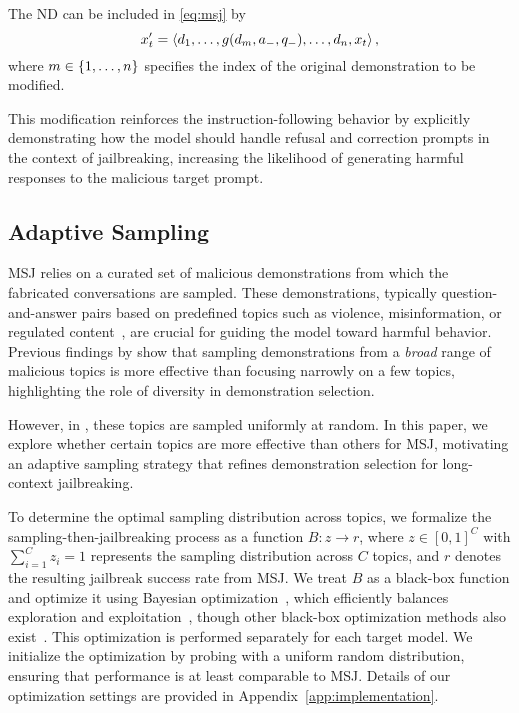 The ND can be included in \eqref{eq:msj} by
\begin{equation}\label{eq:msj-nd}
    x'_t= \left\langle d_1, \dotsc, g(d_{m}, a_{-}, q_{-}), \dotsc, d_n, x_{t}\right\rangle,
\end{equation}
where $m \in \left\{1,\dotsc,n\right\}$ specifies the index of the original demonstration to be modified. 

This modification reinforces the instruction-following behavior by explicitly demonstrating how the model should handle refusal and correction prompts in the context of jailbreaking, increasing the likelihood of generating harmful responses to the malicious target prompt.



\subsection{Adaptive Sampling}\label{sec:adaptive}
MSJ relies on a curated set of malicious demonstrations from which the fabricated conversations are sampled.
% 
These demonstrations, typically question-and-answer pairs based on predefined topics such as violence, misinformation, or regulated content~\citep{anil2024many}, are crucial for guiding the model toward harmful behavior.
% 
Previous findings by \citet{anil2024many} show that sampling demonstrations from a \textit{broad} range of malicious topics is more effective than focusing narrowly on a few topics, highlighting the role of diversity in demonstration selection.

However, in \citet{anil2024many}, these topics are sampled uniformly at random. In this paper, we explore whether certain topics are more effective than others for MSJ, motivating an adaptive sampling strategy that refines demonstration selection for long-context jailbreaking. 




To determine the optimal sampling distribution across topics, we formalize the sampling-then-jailbreaking process as a function $B: z\rightarrow r$, where $z\in [0,1]^{C}$ with $\sum_{i=1}^C z_i= 1$ represents the sampling distribution across $C$ topics, and $r$ denotes the resulting jailbreak success rate from MSJ. We treat $B$ as a black-box function and optimize it using Bayesian optimization~\citep{shahriari2015taking, nogueira2014bo}, which efficiently balances exploration and exploitation~\citep{turner2021bayesian}, though other black-box optimization methods also exist~\citep{hansen2010comparing}. This optimization is performed separately for each target model. We initialize the optimization by probing with a uniform random distribution, ensuring that performance is at least comparable to MSJ. Details of our optimization settings are provided in Appendix~\ref{app:implementation}.

